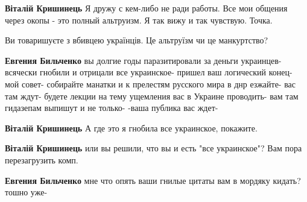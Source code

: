 \begin{itemize}
\begin{itemize}
\textbf{Віталій Кришинець} Я дружу с кем-либо не ради работы. Все мои общения через окопы - это полный альтруизм. Я так вижу и так чувствую. Точка.

 
Ви товаришуєте з вбивцею українців. Це альтруїзм чи це манкуртство?

 
\textbf{Евгения Бильченко} вы долгие годы паразитировали за деньги украинцев-всячески гнобили и отрицали все украинское- пришел ваш логический конец- мой совет- собирайте манатки и к прелестям русского мира в днр езжайте- вас там ждут- будете лекции на тему ущемления вас в Украине проводить- вам там гидазепам выпишут и не только- -ваша публика вас ждет-

 
\textbf{Віталій Кришинець} А где это я гнобила все украинское, покажите.

 
\textbf{Віталій Кришинець} или вы решили, что вы и есть "все украинское"? Вам пора перезагрузить комп.

 
\textbf{Евгения Бильченко} мне что опять ваши гнилые цитаты вам в мордяку кидать? тошно уже-


\end{itemize}
\end{itemize}

